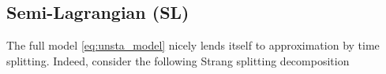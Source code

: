 \documentclass{article}
\numberwithin{equation}{section}
\newcommand{\todo}[1]{{\color{red}\textbf{#1}}}
\begin{document}
\subsection{Semi-Lagrangian (SL)}

The full model \cref{eq:unsta_model} nicely lends itself to approximation by time splitting. Indeed, consider the following Strang splitting decomposition 


%
%
\end{document}
